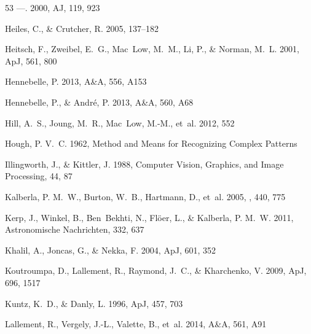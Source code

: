 \documentclass[12pt]{emulateapj}
\begin{document}
\begin{thebibliography}{53}
---. 2000, AJ, 119, 923

Heiles, C., \& Crutcher, R. 2005, 137--182

Heitsch, F., Zweibel, E.~G., Mac~Low, M.~M., Li, P., \& Norman, M.~L. 2001, ApJ, 561, 800

Hennebelle, P. 2013, A\&A, 556, A153

Hennebelle, P., \& Andr{\'e}, P. 2013, A\&A, 560, A68%

Hill, A.~S., Joung, M.~R., Mac~Low, M.-M., {et~al.} 2012, 552

Hough, P. V.~C. 1962, {Method and Means for Recognizing Complex Patterns}

Illingworth, J., \& Kittler, J. 1988, Computer Vision, Graphics, and Image
  Processing, 44, 87

Kalberla, P. M.~W., Burton, W.~B., Hartmann, D., {et~al.} 2005, \aap, 440, 775

Kerp, J., Winkel, B., Ben~Bekhti, N., Fl{\"o}er, L., \& Kalberla, P. M.~W.
  2011, Astronomische Nachrichten, 332, 637

Khalil, A., Joncas, G., \& Nekka, F. 2004, ApJ, 601, 352

Koutroumpa, D., Lallement, R., Raymond, J.~C., \& Kharchenko, V. 2009, ApJ, 696, 1517

Kuntz, K.~D., \& Danly, L. 1996, ApJ, 457, 703

Lallement, R., Vergely, J.-L., Valette, B., {et~al.} 2014, A\&A, 561, A91%


\end{thebibliography}
\end{document}
